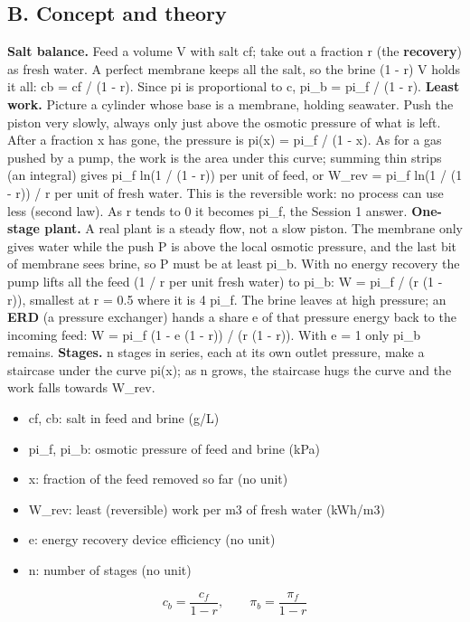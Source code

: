 \documentclass[11pt,a4paper]{article}
\begin{document}
\subsection*{B. Concept and theory}
\textbf{Salt balance.} Feed a volume V with salt cf; take out a fraction r (the \textbf{recovery}) as fresh water. A perfect membrane keeps all the salt, so the brine (1 - r) V holds it all: cb = cf / (1 - r). Since pi is proportional to c, pi\_b = pi\_f / (1 - r). \textbf{Least work.} Picture a cylinder whose base is a membrane, holding seawater. Push the piston very slowly, always only just above the osmotic pressure of what is left. After a fraction x has gone, the pressure is pi(x) = pi\_f / (1 - x). As for a gas pushed by a pump, the work is the area under this curve; summing thin strips (an integral) gives pi\_f ln(1 / (1 - r)) per unit of feed, or W\_rev = pi\_f ln(1 / (1 - r)) / r per unit of fresh water. This is the reversible work: no process can use less (second law). As r tends to 0 it becomes pi\_f, the Session 1 answer. \textbf{One-stage plant.} A real plant is a steady flow, not a slow piston. The membrane only gives water while the push P is above the local osmotic pressure, and the last bit of membrane sees brine, so P must be at least pi\_b. With no energy recovery the pump lifts all the feed (1 / r per unit fresh water) to pi\_b: W = pi\_f / (r (1 - r)), smallest at r = 0.5 where it is 4 pi\_f. The brine leaves at high pressure; an \textbf{ERD} (a pressure exchanger) hands a share e of that pressure energy back to the incoming feed: W = pi\_f (1 - e (1 - r)) / (r (1 - r)). With e = 1 only pi\_b remains. \textbf{Stages.} n stages in series, each at its own outlet pressure, make a staircase under the curve pi(x); as n grows, the staircase hugs the curve and the work falls towards W\_rev.

\begin{itemize}[nosep]
\item cf, cb: salt in feed and brine (g/L)
\item pi\_f, pi\_b: osmotic pressure of feed and brine (kPa)
\item x: fraction of the feed removed so far (no unit)
\item W\_rev: least (reversible) work per m3 of fresh water (kWh/m3)
\item e: energy recovery device efficiency (no unit)
\item n: number of stages (no unit)
\end{itemize}

\begin{equation*}
c_b = \frac{c_f}{1-r},\qquad \pi_b = \frac{\pi_f}{1-r}
\end{equation*}
\end{document}

